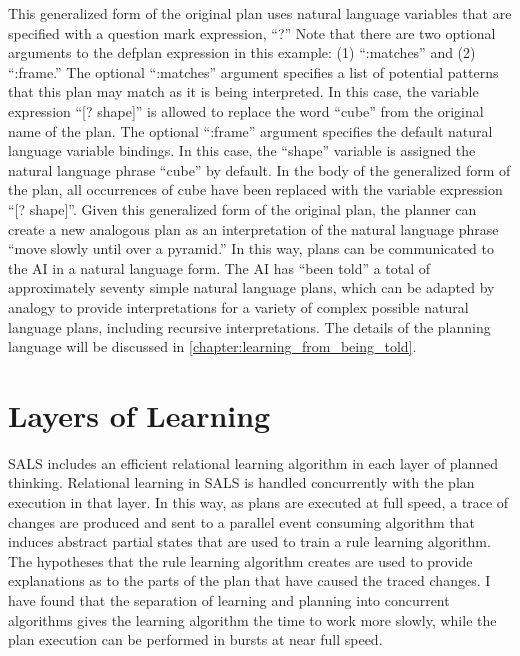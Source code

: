 This generalized form of the original plan uses natural language
variables that are specified with a question mark expression, ``?''
Note that there are two optional arguments to the defplan expression
in this example: (1) ``:matches'' and (2) ``:frame.''  The optional
``:matches'' argument specifies a list of potential patterns that this
plan may match as it is being interpreted.  In this case, the variable
expression ``[? shape]'' is allowed to replace the word ``cube'' from
the original name of the plan.  The optional ``:frame'' argument
specifies the default natural language variable bindings.  In this
case, the ``shape'' variable is assigned the natural language phrase
``cube'' by default.  In the body of the generalized form of the plan,
all occurrences of cube have been replaced with the variable
expression ``[? shape]''.  Given this generalized form of the original
plan, the planner can create a new analogous plan as an interpretation
of the natural language phrase ``move slowly until over a pyramid.''
In this way, plans can be communicated to the AI in a natural language
form.  The AI has ``been told'' a total of approximately seventy
simple natural language plans, which can be adapted by analogy to
provide interpretations for a variety of complex possible natural
language plans, including recursive interpretations.  The details of
the planning language will be discussed in
{\mbox{\autoref{chapter:learning_from_being_told}}}.

\section{Layers of Learning}

SALS includes an efficient relational learning algorithm in each layer
of planned thinking.  Relational learning in SALS is handled
concurrently with the plan execution in that layer.  In this way, as
plans are executed at full speed, a trace of changes are produced and
sent to a parallel event consuming algorithm that induces abstract
partial states that are used to train a rule learning algorithm.  The
hypotheses that the rule learning algorithm creates are used to
provide explanations as to the parts of the plan that have caused the
traced changes.  I have found that the separation of learning and
planning into concurrent algorithms gives the learning algorithm the
time to work more slowly, while the plan execution can be performed in
bursts at near full speed.

